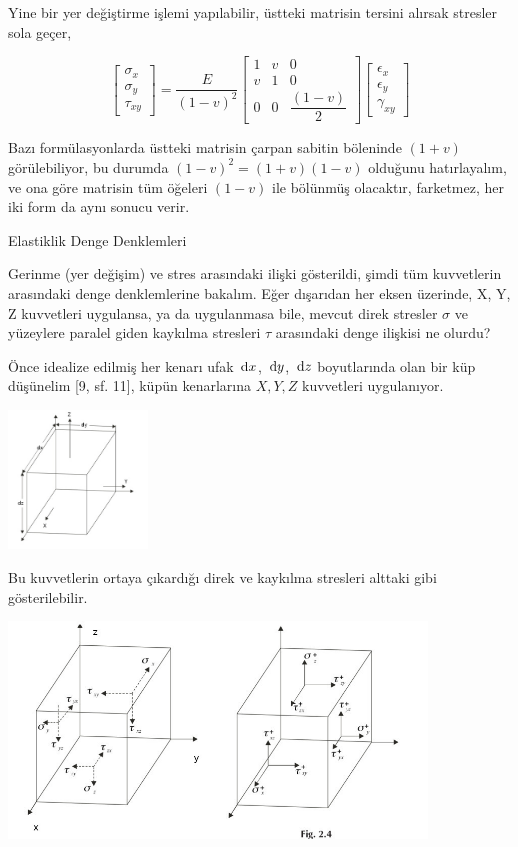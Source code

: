 \documentclass[12pt,fleqn]{article}\usepackage{../../common}
\begin{document}
Yine bir yer değiştirme işlemi yapılabilir, üstteki matrisin tersini alırsak
stresler sola geçer, 

$$
\left[\begin{array}{c}
\sigma_x \\ \sigma_y \\ \tau_{xy}
\end{array}\right] = 
\frac{E}{(1-v)^2}
\left[\begin{array}{ccc}
1 & v & 0 \\ v & 1 & 0 \\ 0 & 0 & \dfrac{(1-v)}{2}
\end{array}\right]
\left[\begin{array}{c}
\epsilon_{x} \\ \epsilon_{y} \\ \gamma_{xy}
\end{array}\right] 
$$

Bazı formülasyonlarda üstteki matrisin çarpan sabitin böleninde $(1+v)$
görülebiliyor, bu durumda $(1-v)^2=(1+v)(1-v)$ olduğunu hatırlayalım, ve ona
göre matrisin tüm öğeleri $(1-v)$ ile bölünmüş olacaktır, farketmez, her iki
form da aynı sonucu verir.

Elastiklik Denge Denklemleri

Gerinme (yer değişim) ve stres arasındaki ilişki gösterildi, şimdi tüm
kuvvetlerin arasındaki denge denklemlerine bakalım. Eğer dışarıdan her eksen
üzerinde, X, Y, Z kuvvetleri uygulansa, ya da uygulanmasa bile, mevcut direk
stresler $\sigma$ ve yüzeylere paralel giden kaykılma stresleri $\tau$
arasındaki denge ilişkisi ne olurdu?

Önce idealize edilmiş her kenarı ufak $\,\mathrm{d} x$, $\,\mathrm{d} y$, $\,\mathrm{d} z$ boyutlarında
olan bir küp düşünelim [9, sf. 11], küpün kenarlarına $X,Y,Z$ kuvvetleri
uygulanıyor.

\includegraphics[width=10em]{equilibrium_stress2.jpg}

Bu kuvvetlerin ortaya çıkardığı direk ve kaykılma stresleri alttaki gibi
gösterilebilir.

\includegraphics[width=30em]{equilibrium_stress1.jpg}
\end{document}
